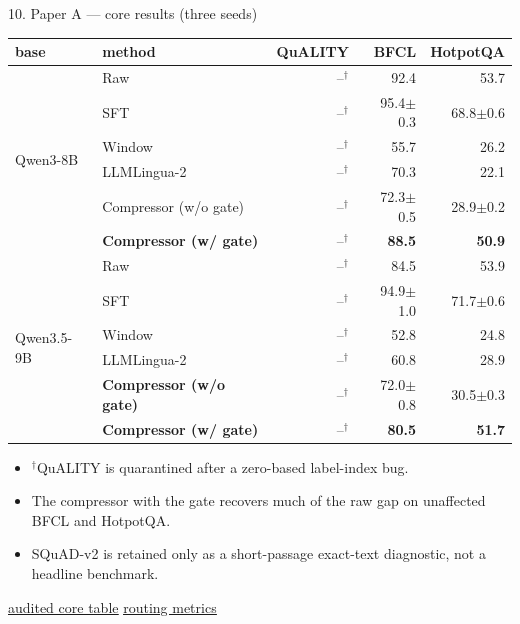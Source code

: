 \documentclass[aspectratio=169]{beamer}
\newcommand{\ghbase}{https://github.com/BDeMo/research-notes/blob/main/notes/plans/08-compressed-context-memory}
\newcommand{\ghA}[2]{\href{\ghbase/papers/paper-a-latent-memory/#1}{\color{blue}\underline{#2}}}
\newcommand{\best}[1]{\textbf{#1}}
\newcommand{\refm}[1]{\textcolor{black!55}{#1}}
\begin{document}
\begin{frame}{10. Paper A --- core results (three seeds)}
  \centering\scriptsize
  \begin{tabular}{llrrr}
  \toprule
  base & method & QuALITY & BFCL & HotpotQA \\
  \midrule
  \multirow{6}{*}{Qwen3-8B}
    & \refm{Raw} & --$^\dagger$ & 92.4 & 53.7 \\
    & \refm{SFT} & --$^\dagger$ & 95.4$\pm$0.3 & 68.8$\pm$0.6 \\
    & Window & --$^\dagger$ & 55.7 & 26.2 \\
    & LLMLingua-2 & --$^\dagger$ & 70.3 & 22.1 \\
    & Compressor (w/o gate) & --$^\dagger$ & 72.3$\pm$0.5 & 28.9$\pm$0.2 \\
    & \best{Compressor (w/ gate)} & --$^\dagger$ & \best{88.5} & \best{50.9} \\
  \midrule
  \multirow{6}{*}{Qwen3.5-9B}
    & \refm{Raw} & --$^\dagger$ & 84.5 & 53.9 \\
    & \refm{SFT} & --$^\dagger$ & 94.9$\pm$1.0 & 71.7$\pm$0.6 \\
    & Window & --$^\dagger$ & 52.8 & 24.8 \\
    & LLMLingua-2 & --$^\dagger$ & 60.8 & 28.9 \\
    & \best{Compressor (w/o gate)} & --$^\dagger$ & 72.0$\pm$0.8 & 30.5$\pm$0.3 \\
    & \best{Compressor (w/ gate)} & --$^\dagger$ & \best{80.5} & \best{51.7} \\
  \bottomrule
  \end{tabular}
  \vspace{0.35em}
  \begin{itemize}\footnotesize
    \item $^\dagger$QuALITY is quarantined after a zero-based label-index bug.
    \item The compressor with the gate recovers much of the raw gap on unaffected BFCL and HotpotQA.
    \item SQuAD-v2 is retained only as a short-passage exact-text diagnostic, not a headline benchmark.
  \end{itemize}
  \begin{block}{}\footnotesize \ghA{current-data-2026-07-19/main-table.md}{audited core table} \; \ghA{current-data-2026-07-19/gate-summary.md}{routing metrics}\end{block}
\end{frame}
\end{document}
